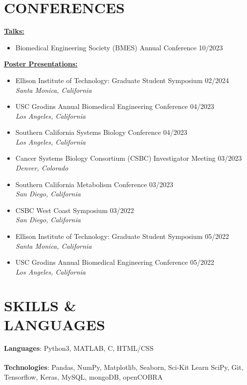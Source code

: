 \documentclass[margin, 10pt]{res} %
\begin{document}
\begin{resume}
\vspace{0.2cm}

\section{CONFERENCES \\}
\hspace{0.3cm}\textbf{\underline{Talks:}}
\begin{itemize} \itemsep -2pt
    \item Biomedical Engineering Society (BMES) Annual Conference \hfill 10/2023
\end{itemize}
\hspace{0.3cm}\textbf{\underline{Poster Presentations:}}
\begin{itemize} \itemsep -2pt
    \item Ellison Institute of Technology: Graduate Student Symposium \hfill 02/2024 \\
    \emph{Santa Monica, California}
    \item USC Grodins Annual Biomedical Engineering Conference \hfill 04/2023 \\
    \emph{Los Angeles, California}
    \item Southern California Systems Biology Conference  \hfill 04/2023 \\
    \emph{Los Angeles, California}
    \item Cancer Systems Biology Consortium (CSBC) Investigator Meeting \hfill 03/2023 \\
    \emph{Denver, Colorado}
    \item Southern California Metabolism Conference \hfill 03/2023 \\
    \emph{San Diego, California}
    \item CSBC West Coast Symposium \hfill 03/2022 \\
    \emph{San Diego, California}
    \item Ellison Institute of Technology: Graduate Student Symposium \hfill 05/2022 \\
    \emph{Santa Monica, California}
    \item USC Grodins Annual Biomedical Engineering Conference \hfill 05/2022 \\
    \emph{Los Angeles, California}
\end{itemize}


\section{SKILLS \& \\ LANGUAGES}
\textbf{Languages}: Python3, MATLAB, C, HTML/CSS \\
\\
\textbf{Technologies}: Pandas, NumPy, Matplotlib, Seaborn, Sci-Kit Learn SciPy, Git, Tensorflow, Keras, MySQL, mongoDB, openCOBRA \\


\end{resume}
\end{document}
